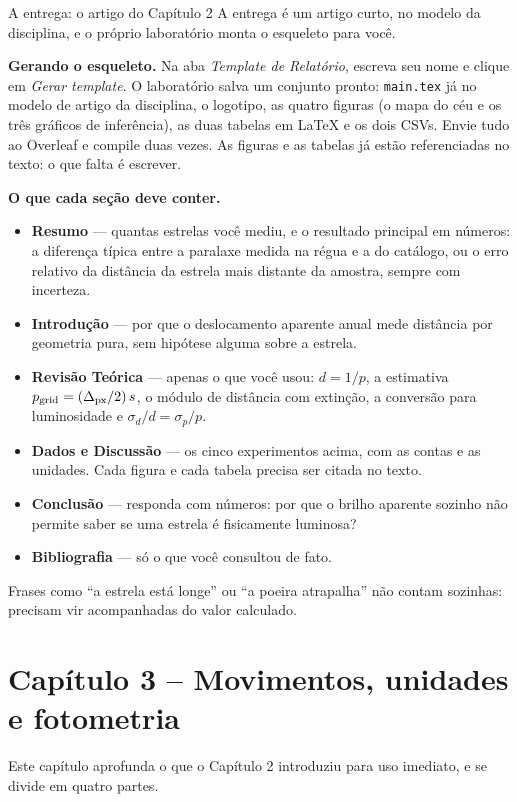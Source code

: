 \documentclass[11pt,a4paper]{article}
\begin{document}
\begin{lessonblock}[borderline west={2pt}{0pt}{astroGold}]{A entrega: o artigo do Capítulo 2}
A entrega é um artigo curto, no modelo da disciplina, e o próprio laboratório monta o esqueleto para você.

\textbf{Gerando o esqueleto.} Na aba \textit{Template de Relatório}, escreva seu nome e clique em \textit{Gerar template}. O laboratório salva um conjunto pronto: \texttt{main.tex} já no modelo de artigo da disciplina, o logotipo, as quatro figuras (o mapa do céu e os três gráficos de inferência), as duas tabelas em LaTeX e os dois CSVs. Envie tudo ao Overleaf e compile duas vezes. As figuras e as tabelas já estão referenciadas no texto: o que falta é escrever.

\textbf{O que cada seção deve conter.}
\begin{itemize}
\item \textbf{Resumo} --- quantas estrelas você mediu, e o resultado principal em números: a diferença típica entre a paralaxe medida na régua e a do catálogo, ou o erro relativo da distância da estrela mais distante da amostra, sempre com incerteza.
\item \textbf{Introdução} --- por que o deslocamento aparente anual mede distância por geometria pura, sem hipótese alguma sobre a estrela.
\item \textbf{Revisão Teórica} --- apenas o que você usou: $d=1/p$, a estimativa $p_{\rm grid}=(\Delta_{\rm px}/2)\,s$, o módulo de distância com extinção, a conversão para luminosidade e $\sigma_d/d=\sigma_p/p$.
\item \textbf{Dados e Discussão} --- os cinco experimentos acima, com as contas e as unidades. Cada figura e cada tabela precisa ser citada no texto.
\item \textbf{Conclusão} --- responda com números: por que o brilho aparente sozinho não permite saber se uma estrela é fisicamente luminosa?
\item \textbf{Bibliografia} --- só o que você consultou de fato.
\end{itemize}

Frases como ``a estrela está longe'' ou ``a poeira atrapalha'' não contam sozinhas: precisam vir acompanhadas do valor calculado.
\end{lessonblock}

\newpage
\section*{Capítulo 3 -- Movimentos, unidades e fotometria}
Este capítulo aprofunda o que o Capítulo 2 introduziu para uso imediato, e se divide em quatro partes.
\end{document}
